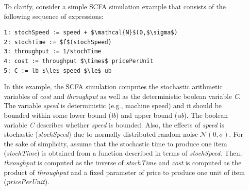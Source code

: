 \documentclass[a4paper, 12pt]{article} %
\begin{document}
\noindent To clarify, consider a simple SCFA simulation example that consists of the following sequence of expressions: 
\begin{lstlisting}
1: stochSpeed := speed + $\mathcal{N}$(0,$\sigma$)
2: stochTime := $f$(stochSpeed)
3: throughput := 1/stochTime
4: cost := throughput $\times$ pricePerUnit
5: C := lb $\le$ speed $\le$ ub
\end{lstlisting}
In this example, the SCFA simulation computes the stochastic arithmetic variables of \textit{cost} and \textit{throughput} as well as the deterministic boolean variable \textit{C}.
The variable \textit{speed} is deterministic (e.g., machine speed) and it should be bounded within some lower bound (\textit{lb}) and upper bound (\textit{ub}).
The boolean variable \textit{C} describes whether \textit{speed} is bounded.
Also, the effects of \textit{speed} is stochastic (\textit{stochSpeed}) due to normally distributed random noise $\mathcal{N}(0,\sigma)$. 
For the sake of simplicity, assume that the stochastic time to produce one item (\textit{stochTime}) is obtained from a function described in terms of \textit{stochSpeed}.
Then, \textit{throughput} is computed as the inverse of \textit{stochTime} and \textit{cost} is computed as the product of \textit{throughput} and a fixed parameter of price to produce one unit of item (\textit{pricePerUnit}).
\end{document}
